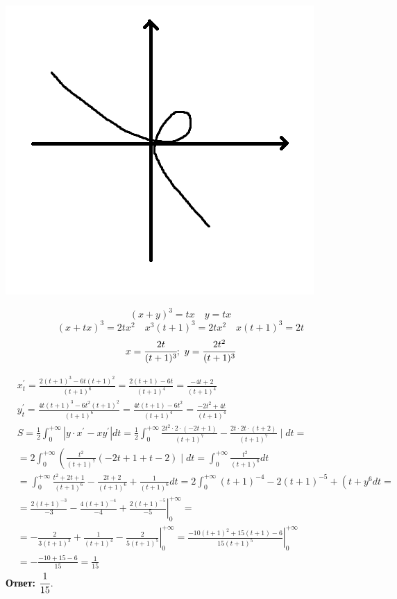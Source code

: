 \begin{minipage}{0.3\textwidth}
\includegraphics[width=\linewidth]{pics/pic2.png}
\end{minipage}
\hfill
\begin{minipage}{0.6\textwidth}\raggedleft
$$(x+y)^3=tx \quad y = tx $$
$$(x+tx)^3=2tx^2 \quad x^3(t+1)^3 = 2tx^2 \quad x(t+1)^3=2t$$
$$x = \cfrac{2t}{(t+1)^3}; ~ y = \cfrac{2t^2}{(t+1)^3}$$
\end{minipage}
$
\begin{aligned}
& x_t^{\prime}=\frac{2(t+1)^3-6 t(t+1)^2}{(t+1)^6}=\frac{2(t+1)-6 t}{(t+1)^4}=\frac{-4 t+2}{(t+1)^4} \\
& y_t^{\prime}=\frac{4 t(t+1)^3-6 t^2(t+1)^2}{(t+1)^6}=\frac{4 t(t+1)-6 t^2}{(t+1)^4}=\frac{-2 t^2+4 t}{(t+1)^4} \\
& S=\frac{1}{2} \int_0^{+\infty}\left|y \cdot x^{\prime}-x y^{\prime}\right| d t=\frac{1}{2} \int_0^{+\infty} \frac{2 t^2 \cdot 2 \cdot(-2 t+1)}{(t+1)^7}-\frac{2 t \cdot 2 t \cdot(t+2)}{(t+1)^7} \mid d t= \\
&= 2 \int_0^{+\infty}\left(\frac{t^2}{(t+1)^7}(-2 t+1+t-2) \mid d t=\int_0^{+\infty} \frac{t^2}{(t+1)^6} d t\right. \\
&= \int_0^{+\infty} \frac{t^2+2 t+1}{(t+1)^6}-\frac{2 t+2}{(t+1)^6}+\frac{1}{(t+1)^6} d t=2 \int_0^{+\infty}(t+1)^{-4}-2(t+1)^{-5}+\left(t+y^6 d t=\right. \\
&= \frac{2(t+1)^{-3}}{-3}-\frac{4(t+1)^{-4}}{-4}+\left.\frac{2(t+1)^{-5}}{-5}\right|_0 ^{+\infty}= \\
&=-\frac{2}{3(t+1)^3}+\frac{1}{(t+1)^4}-\left.\frac{2}{5(t+1)^5}\right|_0 ^{+\infty}=\left.\frac{-10(t+1)^2+15(t+1)-6}{15(t+1)^5}\right|_0 ^{+\infty} \\
&=-\frac{-10+15-6}{15}=\frac{1}{15}
\end{aligned}
$
\textbf{Ответ:} $\cfrac{1}{15}$.

